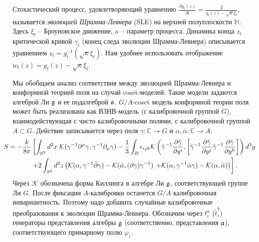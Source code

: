 \documentclass[14pt,autoref,href,facsimile
]{disser}
\begin{document}
Стохастический процесс, удовлетворяющий уравнению 
$
  \frac{\partial g_t(z)}{\partial t} = \frac{ 2}{g_t(z)-\sqrt{\kappa}\xi_{t}} ,
$
называется {\it эволюцией Шрамма-Левнера} (SLE) на верхней полуплоскости $\mathbb{H}$. Здесь $\xi_{t}$ -- Броуновское движение, $\kappa$ -- параметр процесса. Динамика конца  $z_{t}$ критической кривой $\gamma_{t}$ (конец следа эволюции Шрамма-Левнера) описывается уравнением $z_{t}=g_{t}^{-1}(\sqrt{\kappa}\xi_{t})$. Нам удобнее использовать отображение $w_{t} (z)=g_{t}(z)-\sqrt{\kappa}\xi_{t}$. 

Мы обобщаем анализ соответствия между эволюцией Шрамма-Левнера и конформной теорией поля на случай coset-моделей. Такие модели задаются алгеброй Ли $\mathfrak{g}$ и ее подалгеброй $\mathfrak{a}$. 
$G/A$-coset модель конформной теории поля может быть реализована как ВЗНВ-модель (с калибровочной группой $G$), взаимодействующая с чисто калибровочными полями, с калибровочной группой $A\subset G$. Действие записывается через поля $\gamma:\mathbb{C}\to G$ и $\alpha,\bar\alpha:\mathbb{C}\to A$:
\begin{multline}
\label{eq:178}
\hspace{-0.5cm}      S=
-\frac{k}{8\pi}\left[ \int_{S^2} d^2x\; {\cal K} (\gamma^{-1}\partial^{\mu}\gamma,\gamma^{-1}\partial_{\mu}\gamma)-
 \frac{1 }{3} \int_{B}\epsilon_{ijk} {\cal K}\left(
    \tilde \gamma^{-1}\frac{\partial \tilde \gamma}{\partial y^i},
      \left[\tilde \gamma^{-1}\frac{\partial \tilde \gamma}{\partial y^j}
      \tilde \gamma^{-1}\frac{\partial \tilde \gamma}{\partial y^k}\right]\right) d^3y\right.\\
\left.+
2 \int_{S^2} d^{2}z \left(\mathcal{K}(\alpha, \gamma^{-1}\bar \partial \gamma)-\mathcal{K}(\bar \alpha, (\partial \gamma ) \gamma^{-1})\right.
      \left.+\mathcal{K}(\alpha,\gamma^{-1}\bar \alpha \gamma)-\mathcal{K}(\alpha,\bar \alpha)\right)\right].
\end{multline}
Через  $\mathcal{K}$ обозначена форма Киллинга в алгебре Ли $\mathfrak{g}$, соответствующей группе Ли $G$.
После фиксации  $A$-калибровки останется  $G/A$ калибровочная инвариантность. Поэтому надо добавить случайные калибровочные преобразования к эволюции Шрамма-Левнера. Обозначим через $t^{a}_{i}$ ($\tilde{t}^{b}_{i}$) генераторы представления алгебры $\mathfrak{g}$ (соответственно, представления $\mathfrak{a}$), соответствующего примарному полю $\varphi_{i}$.
\end{document}
